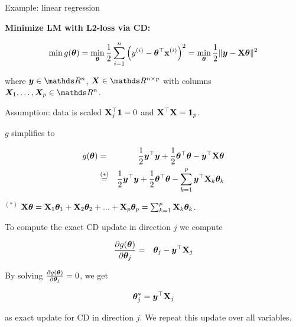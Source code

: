 \documentclass[11pt,compress,t,notes=noshow, xcolor=table]{beamer}
\begin{document}
\begin{vbframe}{Example: linear regression}

\textbf{Minimize LM with L2-loss via CD:}
\vspace*{0.2cm}

$$
    \min g(\bm{\theta}) = \min_{\bm{\theta}} \frac{1}{2}\sum\limits_{i=1}^n \left(y^{(i)} - \bm{\theta}^\top \mathbf{x}^{(i)}\right)^2 = \min_{\bm{\theta}} \frac{1}{2}\|\bm{y} - \mathbf{X} \bm{\theta}\|^2 
$$

where $\bm{y} \in \R^n$, $\bm{X} \in \R^{n \times p}$ with columns $\bm{X}_1, \hdots, \bm{X}_p \in \R^n$. 

\vspace*{0.3cm}

Assumption: data is scaled $\mathbf{X}_j^\top \mathbf{1} = 0$ and $\mathbf{X}^\top \mathbf{X} = \bm{1}_p$. 

\lz 

$g$ simplifies to 

\begin{footnotesize}
\begin{eqnarray*}
    g(\bm{\theta}) &=& \frac{1}{2}\bm{y}^\top \bm{y} + \frac{1}{2}\bm{\theta}^\top \bm{\theta} - \bm{y}^\top \mathbf{X} \bm{\theta}  \\
    &\overset{(*)}{=}& \frac{1}{2}\bm{y}^\top \bm{y} + \frac{1}{2}\bm{\theta}^\top \bm{\theta}  - \sum_{k = 1}^p \bm{y}^\top \mathbf{X}_k \bm{\theta}_k 
\end{eqnarray*}

\vfill
$^{(*)}$ $\mathbf{X} \bm{\theta} = \mathbf{X}_1 \bm{\theta}_1 + \mathbf{X}_2 \bm{\theta}_2 + ... + \mathbf{X}_p \bm{\theta}_p = \sum_{k = 1}^p \mathbf{X}_k \bm{\theta}_k$.
\end{footnotesize}

\framebreak

To compute the exact CD update in direction $j$ we compute 

\begin{eqnarray*}
    \frac{\partial{g}(\bm{\theta})}{\partial \bm{\theta}_j} &=& \bm{\theta}_j - \bm{y}^\top \mathbf{X}_j 
\end{eqnarray*}  

By solving $\frac{\partial{g}(\bm{\theta})}{\partial \bm{\theta}_j} = 0$, we get 

$$
    \bm{\theta}_j^\ast = \bm{y}^\top \mathbf{X}_j
$$ 

as exact update for CD in direction $j$.  We repeat this update over all variables. 



\end{vbframe}
\end{document}
